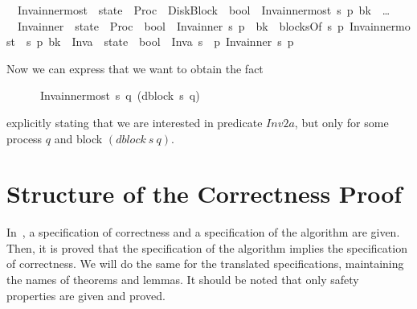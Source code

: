 \begin{isabellebody}
  \ \
  Inv{}a{\isacharunderscore}innermost\
  {\isacharcolon}{\isacharcolon}\ {\isachardoublequote}state\
  {\isasymRightarrow}\ Proc\ {\isasymRightarrow}\ DiskBlock\
  {\isasymRightarrow}\ bool{\isachardoublequote}\isanewline \ \
  {\isachardoublequote}Inv{}a{\isacharunderscore}innermost\
  s\ p\ bk\ {\isasymequiv}\ \ldots\isanewline
  \isanewline \ \ Inv{\isadigit{2}}a{\isacharunderscore}inner\
  {\isacharcolon}{\isacharcolon}\ {\isachardoublequote}state\
  {\isasymRightarrow}\ Proc\ {\isasymRightarrow}\
  bool{\isachardoublequote}\isanewline \ \
  {\isachardoublequote}Inv{}a{\isacharunderscore}inner\ s\
  p\ {\isasymequiv}\ {\isasymforall}bk\ {\isasymin}\ blocksOf\ s\
  p{\isachardot}\ Inv{}a{\isacharunderscore}innermost\ \
  s\ p\ bk{\isachardoublequote}\isanewline \isanewline \ \
  Inv{}a\ {\isacharcolon}{\isacharcolon}\
  {\isachardoublequote}state\ {\isasymRightarrow}\
  bool{\isachardoublequote}\isanewline \ \
  {\isachardoublequote}Inv{}a\ s\ {\isasymequiv}\
  {\isasymforall}p{\isachardot}\
  Inv{}a{\isacharunderscore}inner\ s\
  p{\isachardoublequote}\isanewline
\end{isabellebody}

Now we can express that we want to obtain the fact

\medskip

\begin{isabellebody}
 \ \ \ \ \ \ 
 Inv{\isadigit{2}}a{\isacharunderscore}innermost\ s\ q\ (dblock\ s\ q)
\end{isabellebody}

\medskip

\noindent explicitly stating that we are interested in predicate
$Inv2a$, but only for some process $q$ and block $(dblock\ s\ q)$.



\section{Structure of the Correctness Proof}
\label{sec:Structure-of-the}

In~\cite{Gafni00disk}, a specification of correctness and a
specification of the algorithm are given. Then, it is proved that the
specification of the algorithm implies the specification of
correctness. We will do the same for the translated specifications,
maintaining the names of theorems and lemmas. It should be noted that
only safety properties are given and proved.


